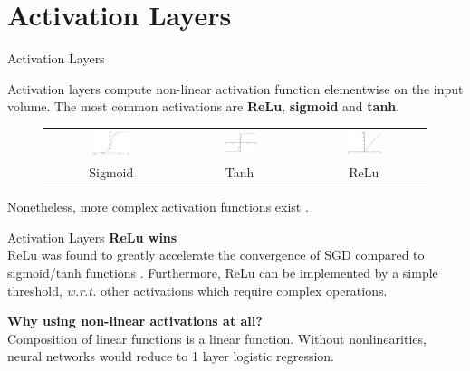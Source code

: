 \documentclass[aspectratio=169]{beamer}
\begin{document}
\section*{Activation Layers}

\begin{frame}{Activation Layers}

Activation layers compute non-linear activation function elementwise on the input volume. The most common activations are \textbf{ReLu}, \textbf{sigmoid} and \textbf{tanh}.
\begin{figure}
\begin{tabular}{ccc}
\includegraphics[width=0.3\textwidth]{img/cnn/act_sigmoid.jpg}&
\includegraphics[width=0.3\textwidth]{img/cnn/act_tanh.jpg} & 
\includegraphics[width=0.3\textwidth]{img/cnn/act_relu.jpg}\\
Sigmoid & Tanh & ReLu
\end{tabular}
\end{figure}
Nonetheless, more complex activation functions exist \cite{he2015delving,goodfellow2013maxout}.
\end{frame}


\begin{frame}{Activation Layers}
\textbf{ReLu wins}\\
ReLu was found to greatly accelerate the convergence of SGD compared to sigmoid/tanh functions \cite{krizhevsky2012imagenet}. Furthermore, ReLu can be implemented by a simple threshold, \emph{w.r.t.} other activations which require complex operations.

\textbf{Why using non-linear activations at all?}\\
Composition of linear functions is a linear function. Without nonlinearities, neural networks would reduce to 1 layer logistic regression.\\

\end{frame}
\end{document}
